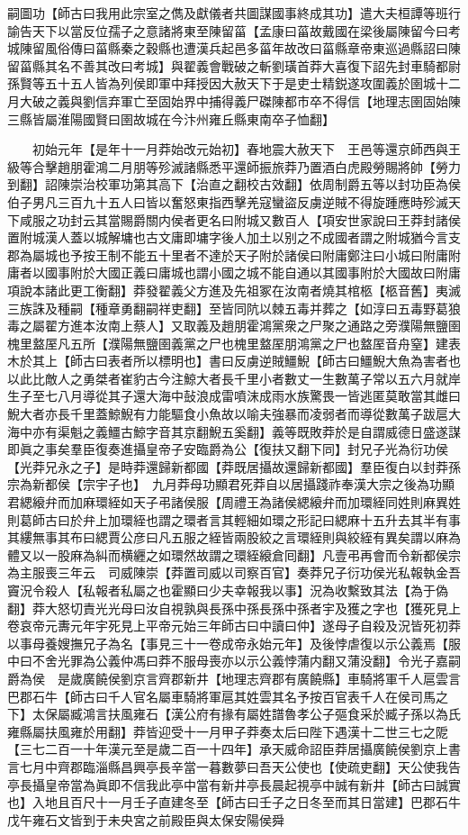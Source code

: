 嗣圖功【師古曰我用此宗室之儁及獻儀者共圖謀國事終成其功】遣大夫桓譚等班行諭告天下以當反位孺子之意諸將東至陳留菑【孟康曰菑故戴國在梁後屬陳留今曰考城陳留風俗傳曰菑縣秦之穀縣也遭漢兵起邑多菑年故改曰菑縣章帝東巡過縣詔曰陳留菑縣其名不善其改曰考城】與翟義會戰破之斬劉璜首莽大喜復下詔先封車騎都尉孫賢等五十五人皆為列侯即軍中拜授因大赦天下于是吏士精鋭遂攻圍義於圉城十二月大破之義與劉信弃軍亡至固始界中捕得義尸磔陳都市卒不得信【地理志圉固始陳三縣皆屬淮陽國賢曰圉故城在今汴州雍丘縣東南卒子恤翻】

　　初始元年【是年十一月莽始改元始初】春地震大赦天下　王邑等還京師西與王級等合擊趙朋霍鴻二月朋等殄滅諸縣悉平還師振旅莽乃置酒白虎殿勞賜將帥【勞力到翻】詔陳崇治校軍功第其高下【治直之翻校古效翻】依周制爵五等以封功臣為侯伯子男凡三百九十五人曰皆以奮怒東指西擊羌寇蠻盜反虜逆賊不得旋踵應時殄滅天下咸服之功封云其當賜爵關内侯者更名曰附城又數百人【項安世家說曰王莽封諸侯置附城漢人蓋以城解墉也古文庸即墉字後人加土以别之不成國者謂之附城猶今言支郡為屬城也予按王制不能五十里者不達於天子附於諸侯曰附庸鄭注曰小城曰附庸附庸者以國事附於大國正義曰庸城也謂小國之城不能自通以其國事附於大國故曰附庸項說本諸此更工衡翻】莽發翟義父方進及先祖冢在汝南者燒其棺柩【柩音舊】夷滅三族誅及種嗣【種章勇翻嗣祥吏翻】至皆同阬以棘五毒并葬之【如淳曰五毒野葛狼毒之屬翟方進本汝南上蔡人】又取義及趙朋霍鴻黨衆之尸聚之通路之旁濮陽無鹽圉槐里盩厔凡五所【濮陽無鹽圉義黨之尸也槐里盩厔朋鴻黨之尸也盩厔音舟窒】建表木於其上【師古曰表者所以標明也】書曰反虜逆賊䲔鯢【師古曰䲔鯢大魚為害者也以此比敵人之勇桀者崔豹古今注鯨大者長千里小者數丈一生數萬子常以五六月就岸生子至七八月導從其子還大海中鼔浪成雷噴沫成雨水族驚畏一皆逃匿莫敢當其雌曰鯢大者亦長千里蓋鯨鯢有力能驅食小魚故以喻夫強暴而凌弱者而導從數萬子跋扈大海中亦有渠魁之義䲔古鯨字音其京翻鯢五奚翻】義等既敗莽於是自謂威德日盛遂謀即眞之事矣羣臣復奏進攝皇帝子安臨爵為公【復扶又翻下同】封兄子光為衍功侯【光莽兄永之子】是時莽還歸新都國【莽既居攝故還歸新都國】羣臣復白以封莽孫宗為新都侯【宗宇子也】　九月莽母功顯君死莽自以居攝踐祚奉漢大宗之後為功顯君緦縗弁而加麻環絰如天子弔諸侯服【周禮王為諸侯緦縗弁而加環絰同姓則麻異姓則葛師古曰於弁上加環絰也謂之環者言其輕細如環之形記曰緦麻十五升去其半有事其縷無事其布曰緦賈公彦曰凡五服之絰皆兩股絞之言環絰則與絞絰有異矣謂以麻為體又以一股麻為糾而横纒之如環然故謂之環絰縗倉囘翻】凡壹弔再會而令新都侯宗為主服喪三年云　司威陳崇【莽置司威以司察百官】奏莽兄子衍功侯光私報執金吾竇況令殺人【私報者私屬之也霍顯曰少夫幸報我以事】況為收繫致其法【為于偽翻】莽大怒切責光光母曰汝自視孰與長孫中孫長孫中孫者宇及獲之字也【獲死見上卷哀帝元夀元年宇死見上平帝元始三年師古曰中讀曰仲】遂母子自殺及況皆死初莽以事母養嫂撫兄子為名【事見三十一卷成帝永始元年】及後悖虐復以示公義焉【服中曰不舍光罪為公義仲馮曰莽不服母喪亦以示公義悖蒲内翻又蒲没翻】令光子嘉嗣爵為侯　是歲廣饒侯劉京言齊郡新井【地理志齊郡有廣饒縣】車騎將軍千人扈雲言巴郡石牛【師古曰千人官名屬車騎將軍扈其姓雲其名予按百官表千人在侯司馬之下】太保屬臧鴻言扶風雍石【漢公府有掾有屬姓譜魯孝公子彄食采於臧子孫以為氏雍縣屬扶風雍於用翻】莽皆迎受十一月甲子莽奏太后曰陛下遇漢十二世三七之阸【三七二百一十年漢元至是歲二百一十四年】承天威命詔臣莽居攝廣饒侯劉京上書言七月中齊郡臨淄縣昌興亭長辛當一暮數夢曰吾天公使也【使疏吏翻】天公使我告亭長攝皇帝當為眞即不信我此亭中當有新井亭長晨起視亭中誠有新井【師古曰誠實也】入地且百尺十一月壬子直建冬至【師古曰壬子之日冬至而其日當建】巴郡石牛戊午雍石文皆到于未央宮之前殿臣與太保安陽侯舜